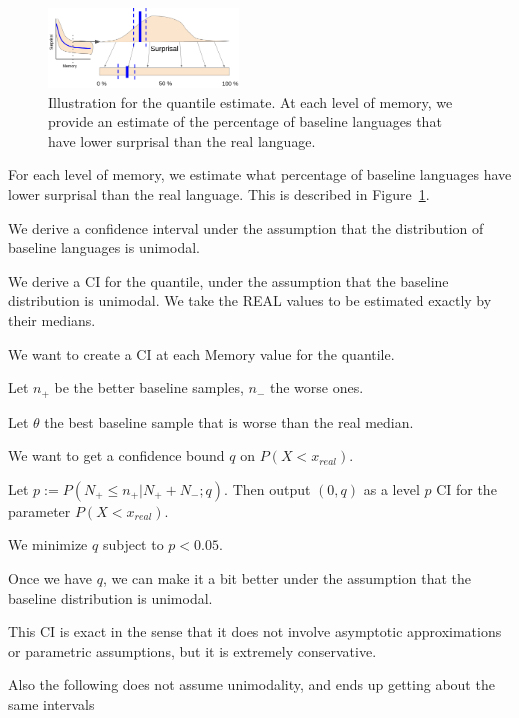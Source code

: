\documentclass[11pt,letterpaper]{article}
\begin{document}
\begin{figure}
	\begin{center}
\includegraphics[width=0.45\textwidth]{figures/quantile.png}
\end{center}
	\caption{Illustration for the quantile estimate. At each level of memory, we provide an estimate of the percentage of baseline languages that have lower surprisal than the real language.}\label{fig:quantile-pointwise}
\end{figure}


For each level of memory, we estimate what percentage of baseline languages have lower surprisal than the real language.
This is described in Figure~\ref{fig:quantile-pointwise}.

We derive a confidence interval under the assumption that the distribution of baseline languages is unimodal.

We derive a CI for the quantile, under the assumption that the baseline distribution is unimodal. We take the REAL values to be estimated exactly by their medians.

We want to create a CI at each Memory value for the quantile.

Let $n_+$ be the better baseline samples, $n_-$ the worse ones.

Let $\theta$ the best baseline sample that is worse than the real median.

We want to get a confidence bound $q$ on $P(X < x_{real})$.

Let $p := P(N_+ \leq n_+ | N_+ + N_-; q)$.
Then output $(0, q)$ as a level $p$ CI for the parameter $P(X < x_{real})$.

We minimize $q$ subject to $p < 0.05$.

Once we have $q$, we can make it a bit better under the assumption that the baseline distribution is unimodal.

This CI is exact in the sense that it does not involve asymptotic approximations or parametric assumptions, but it is extremely conservative.

Also the following does not assume unimodality, and ends up getting about the same intervals
\end{document}
